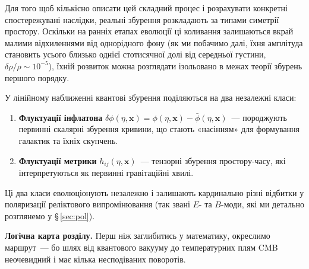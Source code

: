 Для того щоб кількісно описати цей складний процес і розрахувати конкретні
спостережувані наслідки, реальні збурення розкладають за типами симетрії
простору. Оскільки на ранніх етапах еволюції ці коливання залишаються вкрай
малими відхиленнями від однорідного фону (як ми побачимо далі, їхня амплітуда
становить усього близько однієї стотисячної долі від середньої густини,
$\delta\rho/\rho \sim 10^{-5}$), їхній розвиток можна розглядати ізольовано
в межах теорії збурень першого порядку.

У лінійному наближенні квантові збурення поділяються на два незалежні класи:
\begin{enumerate}
  \item \textbf{Флуктуації інфлатона} $\delta\phi(\eta, \mathbf{x}) = \phi(\eta, \mathbf{x}) - \bar{\phi}(\eta, \mathbf{x})$~---
        породжують первинні скалярні збурення кривини, що стають
        «насінням» для формування галактик та їхніх скупчень.
  \item \textbf{Флуктуації метрики} $h_{ij}(\eta, \mathbf{x})$~---
        тензорні збурення простору-часу, які інтерпретуються як первинні
        гравітаційні хвилі.
\end{enumerate}
Ці два класи еволюціонують незалежно і залишають кардинально різні відбитки
у поляризації реліктового випромінювання (так звані $E$- та $B$-моди, які ми
детально розглянемо у §\,\ref{sec:pol}).

\bigskip
\noindent\textbf{Логічна карта розділу.}
Перш ніж заглибитись у математику, окреслимо маршрут~---
бо шлях від квантового вакууму до температурних плям CMB
неочевидний і має кілька несподіваних поворотів.

